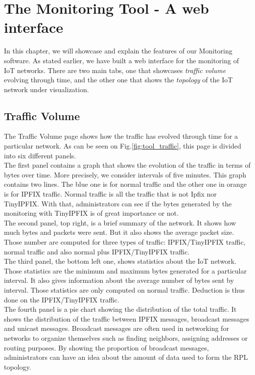 \chapter{The Monitoring Tool - A web interface}

In this chapter, we will showcase and explain the features of our Monitoring software. As stated earlier, we have built a web interface for the monitoring of IoT networks. There are two main tabs, one that showcases \textit{traffic volume} evolving through time, and the other one that shows the \textit{topology} of the IoT network under visualization.

\section{Traffic Volume}

The Traffic Volume page shows how the traffic has evolved through time for a particular network. As can be seen on Fig.\ref{fig:tool_traffic}, this page is divided into six different panels. \\

The first panel contains a graph that shows the evolution of the traffic in terms of bytes over time. More precisely, we consider intervals of five minutes. This graph contains two lines. The blue one is for normal traffic and the other one in orange is for IPFIX traffic. Normal traffic is all the traffic that is not Ipfix nor TinyIPFIX. With that, administrators can see if the bytes generated by the monitoring with TinyIPFIX is of great importance or not. \\

The second panel, top right, is a brief summary of the network. It shows how much bytes and packets were sent. But it also shows the average packet size. Those number are computed for three types of traffic: IPFIX/TinyIPFIX traffic, normal traffic and also normal plus IPFIX/TinyIPFIX traffic.\\

The third panel, the bottom left one, shows statistics about the IoT network. Those statistics are the minimum and maximum bytes generated for a particular interval. It also gives information about the average number of bytes sent by interval. Those statistics are only computed on normal traffic. Deduction is thus done on the IPFIX/TinyIPFIX traffic.\\

The fourth panel is a pie chart showing the distribution of the total traffic. It shows the distribution of the traffic between IPFIX messages, broadcast messages and unicast messages. Broadcast messages are often used in networking for networks to organize  themselves such as finding neighbors, assigning addresses or routing purposes. By showing the proportion of broadcast messages, administrators can have an idea about the amount of data used to form the RPL topology.\\

